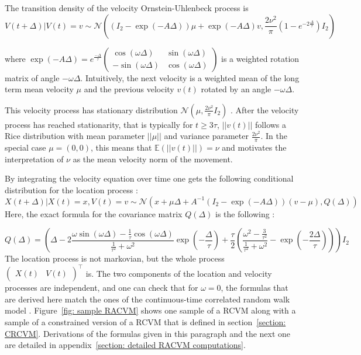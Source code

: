 \documentclass[11pt]{article}
\newcommand {\E}{\mathbb{E}}
\newcommand {\1}{\mathbb{1}}
\begin{document}
The transition density of the velocity Ornstein-Uhlenbeck process is  
\begin{equation}V(t+\Delta) \vert V(t)=v \sim \mathcal{N}\left( (I_2-\exp(-A\Delta))\mu + \exp(-A\Delta)v, \frac{2\nu^2}{\pi}(1-e^{-2\frac{\Delta}{\tau}}) I_2 \right) 
	\label{eq: transition RACVM velocity}
\end{equation}


where $\exp(-A\Delta)=e^{\frac{-\Delta}{\tau}} \begin{pmatrix} \cos(\omega \Delta) & \sin(\omega \Delta) \\ -\sin(\omega \Delta) & \cos(\omega \Delta) \end{pmatrix}$ is a weighted rotation matrix of angle $-\omega \Delta$.
Intuitively, the next velocity is a weighted mean of the long term mean velocity $\mu$ and the previous velocity $v(t)$ rotated by an angle $-\omega \Delta$.


This velocity process has stationary distribution $\mathcal{N}\left(\mu,\frac{2\nu^2}{\pi} I_2\right)$ \cite{gurarie_correlated_2017}. After the velocity process has reached stationarity, that is typically for $t \geq 3\tau$, $\vert \vert v(t) \vert \vert$ follows a Rice distribution with mean parameter $\vert \vert \mu \vert \vert$ and variance parameter $\frac{2\nu^2}{\pi}$. In the special case $\mu=(0,0)$, this means that $\E(\vert \vert v(t) \vert \vert)=\nu$ and motivates the interpretation of $\nu$ as the mean velocity norm of the movement.

By integrating the velocity equation over time one gets the following conditional distribution for the location process :
\begin{equation}
	X(t+\Delta) \vert X(t)=x, V(t)=v \sim \mathcal{N}\left(x+\mu \Delta+A^{-1} \left( I_2-\exp(-A\Delta)\right)(v-\mu),Q(\Delta)\right)  
	\label{eq: transition RACVM location}
\end{equation}
Here, the exact formula for the covariance matrix $Q(\Delta)$ is the following :

\[
Q(\Delta)=\left( \Delta-2 \frac{\omega \sin(\omega \Delta)-\frac{1}{\tau} \cos(\omega \Delta)}{\frac{1}{\tau^2}+\omega^2 } \exp\left( -\frac{\Delta}{\tau} \right) +\frac{\tau}{2} \left( \frac{\omega^2-\frac{3}{\tau^2}}{\frac{1}{\tau^2}+\omega^2}-\exp\left( -\frac{2\Delta}{\tau}\right)\right) \right) I_2
\]
The location process is not markovian, but the whole process $\begin{pmatrix}X(t) &V(t) \end{pmatrix}^\top$ is.
The two components of the location and velocity processes are independent, and one can check that for $\omega=0$, the formulas that are derived here match the ones of the continuous-time correlated random walk model \cite{johnson_continuoustime_2008}. Figure~\ref{fig: sample RACVM} shows one sample of a RCVM along with a sample of a constrained version of a RCVM that is defined in section~\ref{section: CRCVM}. Derivations of the formulas given in this paragraph and the next one are detailed in appendix~\ref{section: detailed RACVM computations}.\\
\end{document}
